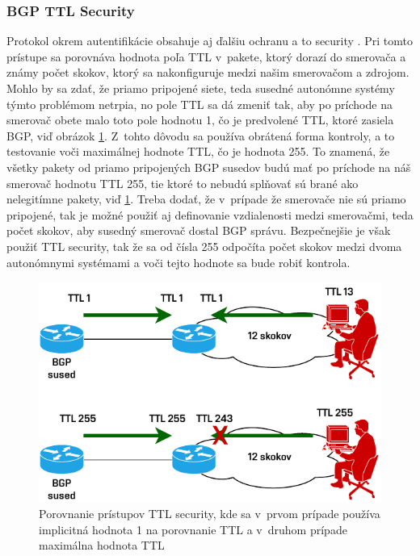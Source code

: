 \subsubsection{BGP TTL Security}
Protokol  okrem autentifikácie obsahuje aj ďalšiu ochranu a to  security \cite{AlHFaPbj6IbKzbuv}. Pri tomto prístupe sa porovnáva hodnota poľa TTL v~pakete, ktorý dorazí do smerovača a známy počet skokov, ktorý sa nakonfiguruje medzi našim smerovačom a zdrojom. Mohlo by sa zdať, že priamo pripojené siete, teda susedné autonómne systémy týmto problémom netrpia, no pole TTL sa dá zmeniť tak, aby po príchode na smerovač obete malo toto pole hodnotu 1, čo je predvolené TTL, ktoré zasiela BGP, viď obrázok \ref{fig:ttl-sec}. Z~tohto dôvodu sa používa obrátená forma kontroly, a to testovanie voči maximálnej hodnote TTL, čo je hodnota 255. To znamená, že všetky pakety od priamo pripojených BGP susedov budú mať po príchode na náš smerovač hodnotu TTL 255, tie ktoré to nebudú splňovať sú brané ako nelegitímne pakety, viď \ref{fig:ttl-sec}. Treba dodať, že v~prípade že smerovače nie sú priamo pripojené, tak je možné použiť aj definovanie vzdialenosti medzi smerovačmi, teda počet skokov, aby susedný smerovač dostal BGP správu. Bezpečnejšie je však použiť TTL security, tak že sa od čísla 255 odpočíta počet skokov medzi dvoma autonómnymi systémami a voči tejto hodnote sa bude robiť kontrola.

\begin{figure}[H]
	\begin{center}
		\includegraphics[scale=1]{obrazky/ttl-sec.pdf}
	\end{center}
	\caption[Porovnanie prístupov TTL security]{Porovnanie prístupov TTL security, kde sa v~prvom prípade používa implicitná hodnota 1 na porovnanie TTL a v~druhom prípade maximálna hodnota TTL \cite{AlHFaPbj6IbKzbuv}}
	\label{fig:ttl-sec}
\end{figure} 


